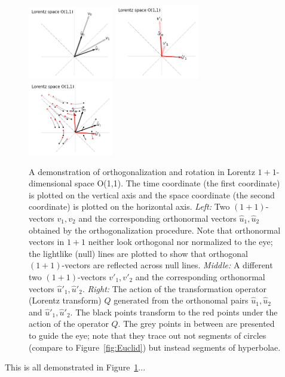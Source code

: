 \documentclass{article}
\newcommand{\plus}{\!+\!} %
\newcommand{\figref}[1]{Figure~\ref{#1}}
\begin{document}
\begin{figure}[t]
\includegraphics[width=0.33\textwidth]{L_v.png}%
\includegraphics[width=0.33\textwidth]{L_vp.png}%
\includegraphics[width=0.33\textwidth]{L_Q.png}
\caption{A demonstration of orthogonalization and rotation in Lorentz $1\plus1$-dimensional space O(1,1).
The time coordinate (the first coordinate) is plotted on the vertical axis and the space coordinate (the second coordinate) is plotted on the horizontal axis.
\textsl{Left:} Two $(1\plus1)$-vectors $v_1, v_2$ and the corresponding orthonormal vectors $\hat{u}_1, \hat{u}_2$ obtained by the orthogonalization procedure.
Note that orthonormal vectors in $1\plus1$ neither look orthogonal nor normalized to the eye; the lightlike (null) lines are plotted to show that orthogonal $(1\plus1)$-vectors are reflected across null lines.
\textsl{Middle:} A different two $(1\plus1)$-vectors $v'_1, v'_2$ and the corresponding orthonormal vectors $\hat{u}'_1, \hat{u}'_2$.
\textsl{Right:} The action of the transformation operator (Lorentz transform) $Q$ generated from the orthonomal pairs $\hat{u}_1, \hat{u}_2$ and $\hat{u}'_1, \hat{u}'_2$.
The black points transform to the red points under the action of the operator $Q$.
The grey points in between are presented to guide the eye; 
note that they trace out not segments of circles (compare to \figref{fig:Euclid}) but instead segments of hyperbolae.\label{fig:Lorentz}}
\end{figure}
This is all demonstrated in \figref{fig:Lorentz}...
\end{document}
